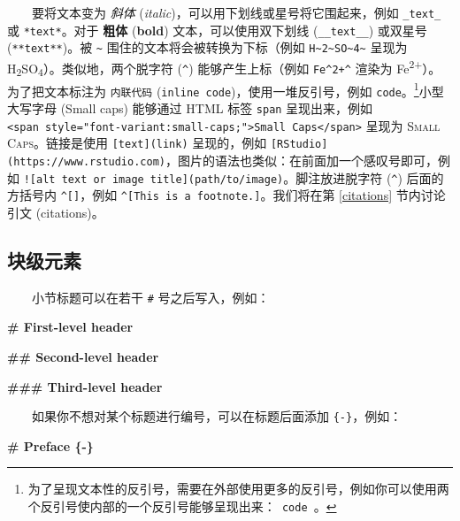 \documentclass[
  12pt,
]{krantz}
\newenvironment{Shaded}{\begin{snugshade}}{\end{snugshade}}
\newcommand{\FunctionTok}[1]{\textcolor[rgb]{0.13,0.29,0.53}{\textbf{#1}}}
\theoremstyle{definition}
\theoremstyle{definition}
\theoremstyle{definition}
\theoremstyle{definition}
\theoremstyle{remark}
\begin{document}
  要将文本变为 \emph{斜体} (\emph{italic})，可以用下划线或星号将它围起来，例如 \texttt{\_text\_} 或 \texttt{*text*}。对于 \textbf{粗体} (\textbf{bold}) 文本，可以使用双下划线 (\texttt{\_\_text\_\_}) 或双星号 (\texttt{**text**})。被 \texttt{\textasciitilde{}} 围住的文本将会被转换为下标（例如 \texttt{H\textasciitilde{}2\textasciitilde{}SO\textasciitilde{}4\textasciitilde{}} 呈现为 H\textsubscript{2}SO\textsubscript{4}）。类似地，两个脱字符 (\texttt{\^{}}) 能够产生上标（例如 \texttt{Fe\^{}2+\^{}} 渲染为 Fe\textsuperscript{2+}）。为了把文本标注为 \texttt{内联代码} (\texttt{inline\ code})，使用一堆反引号，例如 \texttt{\textasciigrave{}code\textasciigrave{}}。\footnote{为了呈现文本性的反引号，需要在外部使用更多的反引号，例如你可以使用两个反引号使内部的一个反引号能够呈现出来：\texttt{\textasciigrave{}\textasciigrave{}\ \textasciigrave{}code\textasciigrave{}\ \textasciigrave{}\textasciigrave{}}。}小型大写字母 (Small caps) 能够通过 HTML 标签 \texttt{span} 呈现出来，例如 \texttt{\textless{}span\ style="font-variant:small-caps;"\textgreater{}Small\ Caps\textless{}/span\textgreater{}} 呈现为 \textsc{Small Caps}。链接是使用 \texttt{{[}text{]}(link)} 呈现的，例如 \texttt{{[}RStudio{]}(https://www.rstudio.com)}，图片的语法也类似：在前面加一个感叹号即可，例如 \texttt{!{[}alt\ text\ or\ image\ title{]}(path/to/image)}。脚注放进脱字符 (\texttt{\^{}}) 后面的方括号内 \texttt{\^{}{[}{]}}，例如 \texttt{\^{}{[}This\ is\ a\ footnote.{]}}。我们将在第 \ref{citations} 节内讨论引文 (citations)。

\hypertarget{ux5757ux7ea7ux5143ux7d20}{%
\subsection{块级元素}\label{ux5757ux7ea7ux5143ux7d20}}

  小节标题可以在若干 \texttt{\#} 号之后写入，例如：

\begin{Shaded}
\begin{Highlighting}[]
\FunctionTok{\# First{-}level header}

\FunctionTok{\#\# Second{-}level header}

\FunctionTok{\#\#\# Third{-}level header}
\end{Highlighting}
\end{Shaded}

  如果你不想对某个标题进行编号，可以在标题后面添加 \texttt{\{-\}}，例如：

\begin{Shaded}
\begin{Highlighting}[]
\FunctionTok{\# Preface \{{-}\}}
\end{Highlighting}
\end{Shaded}
\end{document}
